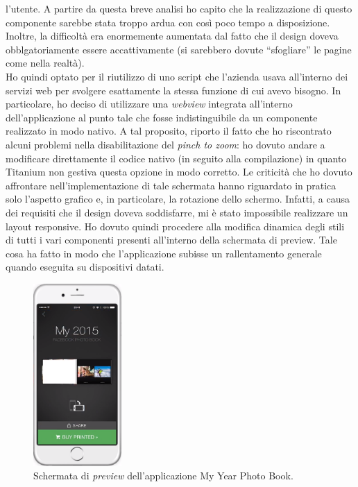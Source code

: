 				l'utente. A partire da questa breve analisi ho capito che la realizzazione di questo componente sarebbe stata
				troppo ardua con così poco tempo a disposizione. Inoltre, la difficoltà era enormemente aumentata dal fatto che il
				design doveva obblgatoriamente essere accattivamente (si sarebbero dovute “sfogliare” le pagine come nella realtà).\\
				Ho quindi optato per il riutilizzo di uno script che l'azienda usava all'interno dei servizi web per svolgere
				esattamente la stessa funzione di cui avevo bisogno. In particolare, ho deciso di utilizzare una \emph{webview}
				integrata all'interno dell'applicazione al punto tale che fosse indistinguibile da un componente realizzato in modo
				nativo. A tal proposito, riporto il fatto che ho riscontrato alcuni problemi nella disabilitazione del
				\emph{pinch to zoom}: ho dovuto andare a modificare direttamente il codice nativo (in seguito alla compilazione)
				in quanto Titanium non gestiva questa opzione in modo corretto.
				Le criticità che ho dovuto affrontare nell'implementazione di tale schermata hanno riguardato in pratica solo
				l'aspetto grafico e, in particolare, la rotazione dello schermo. Infatti, a causa dei requisiti che il design doveva
				soddisfarre, mi è stato impossibile realizzare un layout responsive. Ho dovuto quindi procedere alla modifica
				dinamica degli stili di tutti i vari componenti presenti all'interno della schermata di preview. Tale cosa ha fatto
				in modo che l'applicazione subisse un rallentamento generale quando eseguita su dispositivi datati.
				\begin{figure}[H]
					\centering
					\includegraphics[width=0.3\textwidth]{capitolo_3/immagini/schermata_di_visualizzazione.png}
					\caption{Schermata di \emph{preview} dell'applicazione My Year Photo Book.}
				\end{figure}

